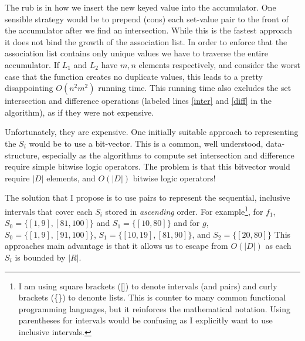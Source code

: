 \documentclass{article}
\begin{document}
The rub is in how we insert the new keyed value into the accumulator.
One sensible strategy would be to prepend (cons) each set-value pair to the
front of the accumulator after we find an intersection.
While this is the fastest approach it does not bind the growth of the
association list.
In order to enforce that the association list contains only unique values
we have to traverse the entire accumulator.
If $L_{1}$ and $L_{2}$ have $m, n$ elements respectively,
and consider the worst case that the function creates no duplicate values,
this leads to a pretty disappointing $O(n^{2}m^{2})$ running time.
This running time also excludes the set intersection and difference
operations (labeled lines \ref{inter} and \ref{diff} in the algorithm),
as if they were not expensive.

Unfortunately, they are expensive.
One initially suitable approach to representing the $S_{i}$ would be
to use a bit-vector.
This is a common, well understood, data-structure,
especially as the algorithms to compute set intersection and difference require
simple bitwise logic operators.
The problem is that this bitvector would require $|D|$ elements,
and $O(|D|)$ bitwise logic operators!

The solution that I propose is to use pairs to represent the sequential,
inclusive intervals that cover each $S_{i}$ stored in \emph{ascending} order.
For example\footnote{I am using square brackets ([]) to denote
intervals (and pairs) and curly brackets (\{\}) to denonte lists.
This is counter to many common functional programming languages,
but it reinforces the mathematical notation.
Using parentheses for intervals would be confusing as I explicitly want to
use inclusive intervals.},
for $f_{1}$, $S_{0} = \{[1,9],[81,100]\}$ and $S_{1} = \{[10,80]\}$
and for $g$, $S_{0} = \{[1,9], [91,100]\}$,
$S_{1} = \{ [10,19], [81,90]\}$,
and $S_{2} = \{[20,80] \}$
This approaches main advantage is that it allows us to escape from $O(|D|)$
as each $S_{i}$ is bounded by $|R|$.
\end{document}

